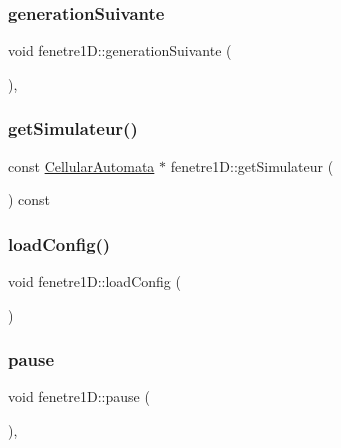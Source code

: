 \subsubsection{\texorpdfstring{generation\+Suivante}{generationSuivante}}
{\footnotesize\ttfamily void fenetre1\+D\+::generation\+Suivante (\begin{DoxyParamCaption}{ }\end{DoxyParamCaption})\hspace{0.3cm}{\ttfamily [private]}, {\ttfamily [slot]}}

\mbox{\label{classfenetre1_d_a28ab62ea0d20e9f9dd5b3135a385314b}} 
\subsubsection{\texorpdfstring{get\+Simulateur()}{getSimulateur()}}
{\footnotesize\ttfamily const \mbox{\hyperlink{class_cellular_automata}{Cellular\+Automata}} $\ast$ fenetre1\+D\+::get\+Simulateur (\begin{DoxyParamCaption}{ }\end{DoxyParamCaption}) const}

\mbox{\label{classfenetre1_d_a13fdb7f89649288068f46b6aaf643053}} 
\subsubsection{\texorpdfstring{load\+Config()}{loadConfig()}}
{\footnotesize\ttfamily void fenetre1\+D\+::load\+Config (\begin{DoxyParamCaption}{ }\end{DoxyParamCaption})}

\mbox{\label{classfenetre1_d_af5560aef0fb4dd20062b3e27d18735b8}} 
\subsubsection{\texorpdfstring{pause}{pause}}
{\footnotesize\ttfamily void fenetre1\+D\+::pause (\begin{DoxyParamCaption}{ }\end{DoxyParamCaption})\hspace{0.3cm}{\ttfamily [private]}, {\ttfamily [slot]}}

